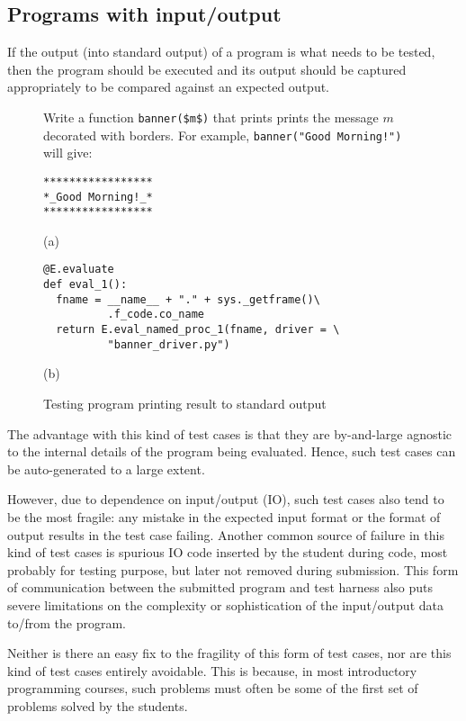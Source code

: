 \documentclass[sigconf]{acmart}
\begin{document}
\subsection{Programs with input/output} \label{s:pio}
If the output (into standard output) of a program is what needs to be tested, then the program should be executed and its output should be captured appropriately to be compared against an expected output.

\begin{figure}
\begin{mdframed}[frametitle=Example]
Write a function \lstinline[style=pc]@banner($m$)@ that prints prints the message $m$ decorated with borders. For example, \lstinline[style=pc]@banner("Good Morning!")@ will give:

\begin{lstlisting}[style=oc]
*****************
*_Good Morning!_*
*****************
\end{lstlisting}
\end{mdframed}

(a)

\begin{lstlisting}[style=pc]
@E.evaluate
def eval_1():
  fname = __name__ + "." + sys._getframe()\
          .f_code.co_name
  return E.eval_named_proc_1(fname, driver = \
          "banner_driver.py")
\end{lstlisting}

(b)
\caption{Testing program printing result to standard output}
\label{f:pso}
\end{figure}
The advantage with this kind of test cases is that they are by-and-large agnostic to the internal details of the program being evaluated. Hence, such test cases can be auto-generated to a large extent.

However, due to dependence on input/output (IO), such test cases also tend to be the most fragile: any mistake in the expected input format or the format of output results in the test case failing. Another common source of failure in this kind of test cases is spurious IO code inserted by the student during code, most probably for testing purpose, but later not removed during submission. This form of communication between the submitted program and test harness also puts severe limitations on the complexity or sophistication of the input/output data to/from the program.

Neither is there an easy fix to the fragility of this form of test cases, nor are this kind of test cases entirely avoidable. This is because, in most introductory programming courses, such problems must often be some of the first set of problems solved by the students.
\end{document}
